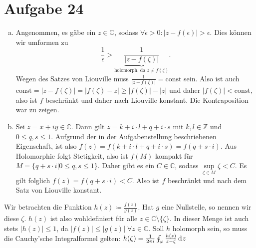 \documentclass{article}
\theoremstyle{definition}
\newcommand{\Z}{\mathbb{Z}}
\newcommand{\C}{\mathbb{C}}
\begin{document}
\section*{Aufgabe 24}
\begin{enumerate}[(a)]
	\item Angenommen, es gäbe ein $z \in \C$, sodass $\forall \epsilon > 0: |z - f(\epsilon)| > \epsilon$. Dies können wir umformen zu $$\frac{1}{\epsilon} > \underbrace{\frac{1}{|z - f(\zeta)|}}_{\text{holomorph, da }z\neq f(\zeta)}.$$ Wegen des Satzes von Liouville muss $ \frac{1}{|z - f(\zeta)|} = \text{const}$ sein. Also ist auch $\text{const} = |z - f(\zeta)| = |f(\zeta) - z| \geq |f(\zeta)| - |z|$ und daher $|f(\zeta)| < \text{const}$, also ist $f$ beschränkt und daher nach Liouville konstant. Die Kontraposition war zu zeigen.
	\item Sei $z = x + iy\in \C$. Dann gilt $z = k + i\cdot l + q + i \cdot s$ mit $k, l \in \Z$ und $0 \leq q, s \leq 1$. Aufgrund der in der Aufgabenstellung beschriebenen Eigenschaft, ist also $f(z) = f(k + i\cdot l + q + i \cdot s) = f(q + s\cdot i)$. Aus Holomorphie folgt Stetigkeit, also ist $f(M)$ kompakt für $M = \{q + s \cdot i|0\leq q,s \leq 1\}$. Daher gibt es ein $C \in \C$, sodass $\sup\limits_{\zeta \in M} \zeta < C$. Es gilt folglich $f(z) = f(q + s\cdot i) < C$. Also ist $f$ beschränkt und nach dem Satz von Liouville konstant.
\end{enumerate}
\item Wir betrachten die Funktion $h(z) \coloneqq \frac{f(z)}{g(z)}$. Hat $g$ eine Nullstelle, so nennen wir diese $\zeta$. $h(z)$ ist also wohldefiniert für alle $z \in \C \setminus\{\zeta\}$. In dieser Menge ist auch stets $|h(z)| \leq 1$, da $|f(z)| \leq |g(z)|\; \forall z \in \C$. Soll $h$ holomorph sein, so muss die Cauchy'sche Integralformel gelten: $h(\zeta) = \frac{1}{2\pi i} \oint_\varphi \frac{h(z)}{z - \zeta} \d z$
\end{document}
